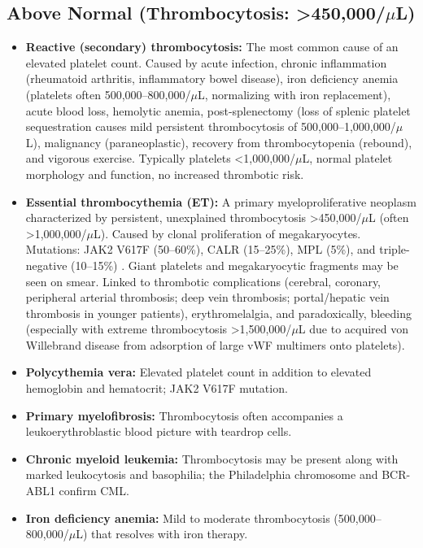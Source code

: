 \subsection*{Above Normal (Thrombocytosis: >450,000/$\mu$L)}
\begin{itemize}
  \item \textbf{Reactive (secondary) thrombocytosis:} The most common cause of an elevated platelet count. Caused by acute infection, chronic inflammation (rheumatoid arthritis, inflammatory bowel disease), iron deficiency anemia (platelets often 500,000--800,000/$\mu$L, normalizing with iron replacement), acute blood loss, hemolytic anemia, post-splenectomy (loss of splenic platelet sequestration causes mild persistent thrombocytosis of 500,000--1,000,000/$\mu$L), malignancy (paraneoplastic), recovery from thrombocytopenia (rebound), and vigorous exercise. Typically platelets <1,000,000/$\mu$L, normal platelet morphology and function, no increased thrombotic risk.
  \item \textbf{Essential thrombocythemia (ET):} A primary myeloproliferative neoplasm characterized by persistent, unexplained thrombocytosis >450,000/$\mu$L (often >1,000,000/$\mu$L). Caused by clonal proliferation of megakaryocytes. Mutations: JAK2 V617F (50--60\%), CALR (15--25\%), MPL (5\%), and triple-negative (10--15\%) \cite{barbui2018who}. Giant platelets and megakaryocytic fragments may be seen on smear. Linked to thrombotic complications (cerebral, coronary, peripheral arterial thrombosis; deep vein thrombosis; portal/hepatic vein thrombosis in younger patients), erythromelalgia, and paradoxically, bleeding (especially with extreme thrombocytosis >1,500,000/$\mu$L due to acquired von Willebrand disease from adsorption of large vWF multimers onto platelets).
  \item \textbf{Polycythemia vera:} Elevated platelet count in addition to elevated hemoglobin and hematocrit; JAK2 V617F mutation.
  \item \textbf{Primary myelofibrosis:} Thrombocytosis often accompanies a leukoerythroblastic blood picture with teardrop cells.
  \item \textbf{Chronic myeloid leukemia:} Thrombocytosis may be present along with marked leukocytosis and basophilia; the Philadelphia chromosome and BCR-ABL1 confirm CML.
  \item \textbf{Iron deficiency anemia:} Mild to moderate thrombocytosis (500,000--800,000/$\mu$L) that resolves with iron therapy.
\end{itemize}

